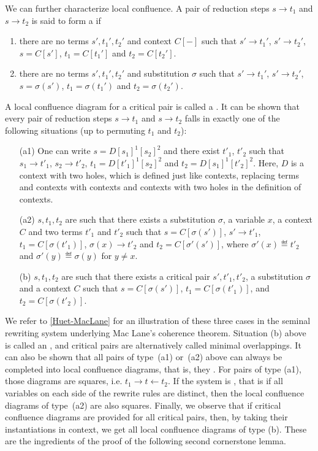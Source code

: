 We can further characterize local confluence. 
A pair of reduction steps $s \to t_1$ and $s\to t_2$ is said to form a    if 
\begin{enumerate}
  \item there are no terms $s',t_1',t_2'$ and context $C[-]$ such that $s' \to t_1'$, $s' \to t_2'$, $s=C[s']$, $t_1=C[t_1']$ and $t_2=C[t_2']$.
  \item there are no terms $s',t_1',t_2'$ and substitution $\sigma$ such that $s' \to t_1'$, $s' \to t_2'$, $s=\sigma(s')$, $t_1=\sigma(t_1')$ and $t_2=\sigma(t_2')$.
\end{enumerate}
A local confluence diagram  for a critical pair is called a .
It can be shown that every pair of reduction steps  $s \to t_1$ and $s\to t_2$ falls in exactly one of the following situations (up to permuting $t_1$ and $t_2$):
\begin{enumerate}
\item[(a1)] One can write $s=D[s_1]^1[s_2]^2$ and there exist $t'_1$, $t'_2$ such that $s_1\to t'_1$, $s_2\to t'_2$, $t_1=D[t'_1]^1[s_2]^2$ and $t_2=D[s_1]^1[t'_2]^2$. 
Here, $D$ is a context with two holes, which is defined just like contexts, replacing terms and contexts with contexts and contexts with two holes in the definition of contexts.
\item[(a2)] $s,t_1,t_2$ are such that there exists a substitution $\sigma$, a variable $x$, a context $C$  and two terms $t'_1$ and $t'_2$ such that
$s=C[\sigma(s')]$, $s'\to t'_1$, $t_1=C[\sigma(t'_1)]$, $\sigma(x)\to t'_2$ and 
$t_2=C[\sigma'(s')]$, where $\sigma'(x)\eqdef t'_2$ and $\sigma'(y)\eqdef \sigma(y)$ for $y\not = x$.
\item[(b)] $s,t_1,t_2$ are such that there exists a critical pair $s',t'_1,t'_2$, a substitution $\sigma$ and a context $C$ such that $s=C[\sigma(s')]$, $t_1=C[\sigma(t'_1)]$, and $t_2=C[\sigma(t'_2)]$.
\end{enumerate}
We refer to \cref{Huet-MacLane} for an illustration of these three cases in the seminal rewriting system underlying Mac Lane's coherence theorem.
Situation (b) above is called an , and critical pairs are alternatively called minimal overlappings.
It can also be shown that all pairs of type~(a1) or~(a2) above can always be completed into local confluence diagrams, that is, they . 
For pairs of type (a1), those  diagrams are squares, i.e. $t_1 \to t \leftarrow t_2$. 
If the system is , that is if all variables on each side of the rewrite rules are distinct, then the local confluence diagrams of type~(a2) are also squares.
Finally, we observe that if critical confluence diagrams are provided for all critical pairs, then, by taking their instantiations in context, we get all local confluence diagrams of type (b).  These are the ingredients of the proof of the following second cornerstone lemma.


